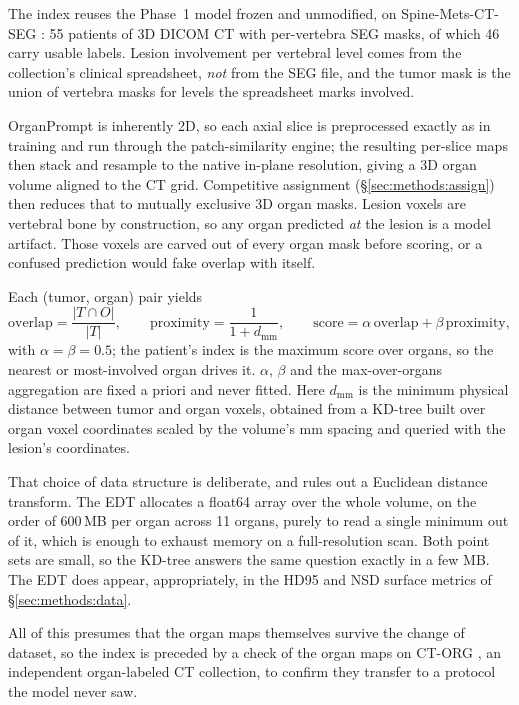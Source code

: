 The index reuses the Phase~1 model frozen and unmodified, on Spine-Mets-CT-SEG
\cite{pieper2024spinemets}: 55 patients of 3D DICOM CT with per-vertebra SEG
masks, of which 46 carry usable labels. Lesion involvement per vertebral
level comes from the collection's clinical spreadsheet, \emph{not} from the SEG
file, and the tumor mask is the union of vertebra masks for levels the
spreadsheet marks involved.

OrganPrompt is inherently 2D, so each axial slice is preprocessed exactly as in
training and run through the patch-similarity engine; the resulting per-slice
maps then stack and resample to the native in-plane resolution, giving a 3D
organ volume aligned to the CT grid. Competitive assignment
(\S\ref{sec:methods:assign}) then reduces that to mutually exclusive 3D organ
masks. Lesion voxels are vertebral bone by construction, so any organ predicted
\emph{at} the lesion is a model artifact. Those voxels are carved out of every
organ mask before scoring, or a confused prediction would fake overlap with
itself.

Each (tumor, organ) pair yields
\begin{equation}
\text{overlap} = \frac{|T \cap O|}{|T|},
\qquad
\text{proximity} = \frac{1}{1 + d_{\text{mm}}},
\qquad
\text{score} = \alpha\,\text{overlap} + \beta\,\text{proximity},
\end{equation}
with $\alpha = \beta = 0.5$; the patient's index is the maximum score over
organs, so the nearest or most-involved organ drives it. $\alpha$, $\beta$ and
the max-over-organs aggregation are fixed a priori and never fitted. Here
$d_{\text{mm}}$ is the minimum physical distance between tumor and organ voxels,
obtained from a KD-tree built over organ voxel coordinates scaled by the
volume's mm spacing and queried with the lesion's coordinates.

That choice of data structure is deliberate, and rules out a Euclidean distance
transform. The EDT allocates a float64 array over the whole volume, on the order
of 600\,MB per organ across 11 organs, purely to read a single minimum out of
it, which is enough to exhaust memory on a full-resolution scan. Both point sets
are small, so the KD-tree answers the same question exactly in a few MB. The EDT
does appear, appropriately, in the HD95 and NSD surface metrics of
\S\ref{sec:methods:data}.

All of this presumes that the organ maps themselves survive the change of
dataset, so the index is preceded by a check of the organ maps on CT-ORG
\cite{rister2020ctorg}, an independent organ-labeled CT collection, to confirm
they transfer to a protocol the model never saw.

